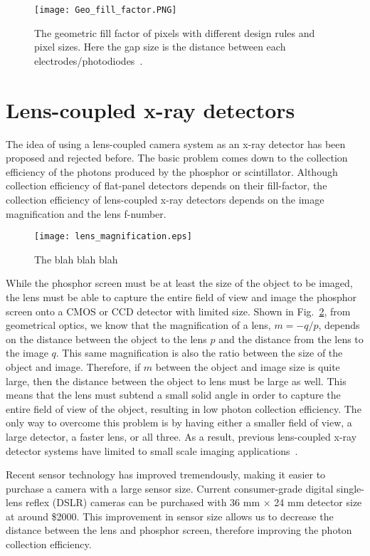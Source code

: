 \begin{figure}[h]
\texttt{[image: Geo\_fill\_factor.PNG]}
\caption{The geometric fill factor of pixels with different design rules and pixel sizes.  Here the gap size is the distance between each electrodes/photodiodes~\citep{Rowlands2000}.}
\label{fig:fill_factor}
\end{figure}

\section{Lens-coupled x-ray detectors}
The idea of using a lens-coupled camera system as an x-ray detector has been proposed and rejected before.  The basic problem comes down to the collection efficiency of the photons produced by the phosphor or scintillator.  Although collection efficiency of flat-panel detectors depends on their fill-factor, the collection efficiency of lens-coupled x-ray detectors depends on the image magnification and the lens f-number.

\begin{figure}[h]
\texttt{[image: lens\_magnification.eps]}
\caption{The blah blah blah}
\label{fig:lens_magnification}
\end{figure}

While the phosphor screen must be at least the size of the object to be imaged, the lens must be able to capture the entire field of view and image the phosphor screen onto a CMOS or CCD detector with limited size.  Shown in Fig.~\ref{fig:lens_magnification}, from geometrical optics, we know that the magnification of a lens, $m = -q/p$, depends on the distance between the object to the lens $p$ and the distance from the lens to the image $q$.  This same magnification is also the ratio between the size of the object and image.  Therefore, if $m$ between the object and image size is quite large, then the distance between the object to lens must be large as well.  This means that the lens must subtend a small solid angle in order to capture the entire field of view of the object, resulting in low photon collection efficiency.  The only way to overcome this problem is by having either a smaller field of view, a large detector, a faster lens, or all three.  As a result, previous lens-coupled x-ray detector systems have limited to small scale imaging applications~\citep{lee2001, kim2005, tate2005, madden2006}.  

Recent sensor technology has improved tremendously, making it easier to purchase a camera with a large sensor size.  Current consumer-grade digital single-lens reflex (DSLR) cameras can be purchased with 36 mm $\times$ 24 mm detector size at around \$2000.  This improvement in sensor size allows us to decrease the distance between the lens and phosphor screen, therefore improving the photon collection efficiency.

